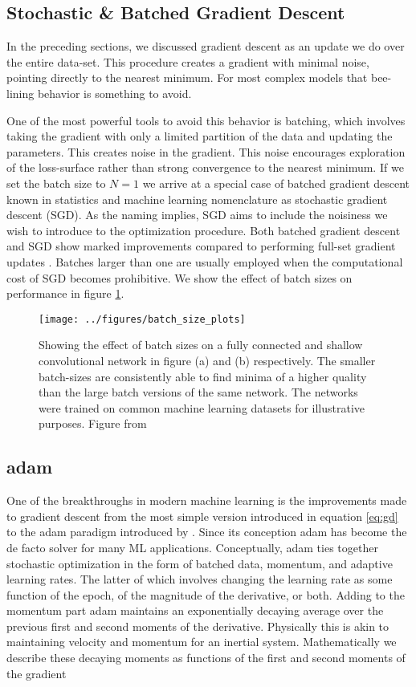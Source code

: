 \subsection{Stochastic \& Batched Gradient Descent}
In the preceding sections, we discussed gradient descent as an update we do over the entire data-set. This procedure creates a gradient with minimal noise, pointing directly to the nearest minimum. For most complex models that bee-lining behavior is something to avoid. 

One of the most powerful tools to avoid this behavior is batching, which involves taking the gradient with only a limited partition of the data and updating the parameters. This creates noise in the gradient. This noise encourages exploration of the loss-surface rather than strong convergence to the nearest minimum. If we set the batch size to $N=1$ we arrive at a special case of batched gradient descent known in statistics and machine learning nomenclature as stochastic gradient descent (SGD). As the naming implies, SGD aims to include the noisiness we wish to introduce to the optimization procedure. Both batched gradient descent and SGD show marked improvements compared to performing full-set gradient updates \cite{Keskar2016}. 
Batches larger than one are usually employed when the computational cost of SGD becomes prohibitive. We show the effect of batch sizes on performance in figure \ref{fig:batch_size}. 

\begin{figure}[ht]
\centering
\texttt{[image: ../figures/batch\_size\_plots]}
\caption[Effect of the batch size on performance]{Showing the effect of batch sizes on a fully connected and shallow convolutional network in figure (a) and (b) respectively. The smaller batch-sizes are consistently able to find minima of a higher quality than the large batch versions of the same network. The networks were trained on common machine learning datasets for illustrative purposes. Figure from \citet{Keskar2016} }\label{fig:batch_size}
\end{figure}

\subsection{adam}\label{sec:adam}
One of the breakthroughs in modern machine learning is the improvements made to gradient descent from the most simple version introduced in equation \ref{eq:gd} to the adam paradigm introduced by \citet{Kingma2015}. Since its conception adam has become the de facto solver for many ML applications. Conceptually, adam ties together stochastic optimization in the form of batched data, momentum, and adaptive learning rates. The latter of which involves changing the learning rate as some function of the epoch, of the magnitude of the derivative, or both. Adding to the momentum part adam maintains an exponentially decaying average over the previous first and second moments of the derivative. Physically this is akin to maintaining velocity and momentum for an inertial system. Mathematically we describe these decaying moments as functions of the first and second  moments of the gradient 

